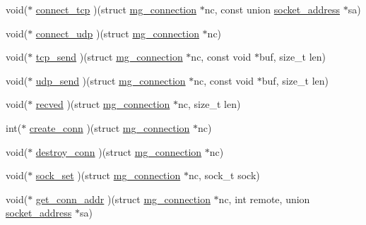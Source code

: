 \begin{DoxyCompactItemize}
\item 
void($\ast$ \hyperlink{structmg__iface__vtable_a9dfae9823c533b3a3cf22501f7794f0a_a9dfae9823c533b3a3cf22501f7794f0a}{connect\+\_\+tcp} )(struct \hyperlink{structmg__connection}{mg\+\_\+connection} $\ast$nc, const union \hyperlink{unionsocket__address}{socket\+\_\+address} $\ast$sa)
\item 
void($\ast$ \hyperlink{structmg__iface__vtable_a254b3a4b9c6d71ad2e28b634938ff039_a254b3a4b9c6d71ad2e28b634938ff039}{connect\+\_\+udp} )(struct \hyperlink{structmg__connection}{mg\+\_\+connection} $\ast$nc)
\item 
void($\ast$ \hyperlink{structmg__iface__vtable_a73eaa7dd92a2be5503f947972deb3e2c_a73eaa7dd92a2be5503f947972deb3e2c}{tcp\+\_\+send} )(struct \hyperlink{structmg__connection}{mg\+\_\+connection} $\ast$nc, const void $\ast$buf, size\+\_\+t len)
\item 
void($\ast$ \hyperlink{structmg__iface__vtable_a0b9b282504e25ca9d64fcd2425a5fe41_a0b9b282504e25ca9d64fcd2425a5fe41}{udp\+\_\+send} )(struct \hyperlink{structmg__connection}{mg\+\_\+connection} $\ast$nc, const void $\ast$buf, size\+\_\+t len)
\item 
void($\ast$ \hyperlink{structmg__iface__vtable_af8c7c999331da0f1d0ac1fda3846b61d_af8c7c999331da0f1d0ac1fda3846b61d}{recved} )(struct \hyperlink{structmg__connection}{mg\+\_\+connection} $\ast$nc, size\+\_\+t len)
\item 
int($\ast$ \hyperlink{structmg__iface__vtable_a06792b088f508f37cca62ffa1a6ca133_a06792b088f508f37cca62ffa1a6ca133}{create\+\_\+conn} )(struct \hyperlink{structmg__connection}{mg\+\_\+connection} $\ast$nc)
\item 
void($\ast$ \hyperlink{structmg__iface__vtable_a807f493abe8b61ee2188b36a16a5ecd0_a807f493abe8b61ee2188b36a16a5ecd0}{destroy\+\_\+conn} )(struct \hyperlink{structmg__connection}{mg\+\_\+connection} $\ast$nc)
\item 
void($\ast$ \hyperlink{structmg__iface__vtable_a1cca4d335d41b5f40573a657fa022575_a1cca4d335d41b5f40573a657fa022575}{sock\+\_\+set} )(struct \hyperlink{structmg__connection}{mg\+\_\+connection} $\ast$nc, sock\+\_\+t sock)
\item 
void($\ast$ \hyperlink{structmg__iface__vtable_a7b83f83b265b8d10bb85fafd726aab9d_a7b83f83b265b8d10bb85fafd726aab9d}{get\+\_\+conn\+\_\+addr} )(struct \hyperlink{structmg__connection}{mg\+\_\+connection} $\ast$nc, int remote, union \hyperlink{unionsocket__address}{socket\+\_\+address} $\ast$sa)
\end{DoxyCompactItemize}


